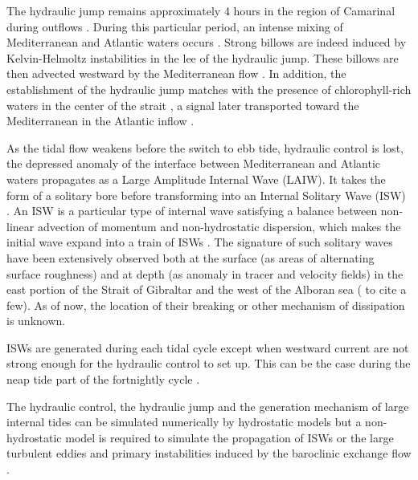 The hydraulic jump remains approximately 4 hours in the region of Camarinal during outflows \citep{FA1988,vlasenko_2009}. During this particular period, an intense mixing of Mediterranean and Atlantic waters occurs \citep{wesson_1994,macias_2006,GarciaLafuente2011}. Strong billows are indeed induced by Kelvin-Helmoltz instabilities in the lee of the hydraulic jump. These billows are then advected westward by the Mediterranean flow \citep{wesson_1994}. In addition, the establishment of the hydraulic jump matches with the presence of chlorophyll-rich waters in the center of the strait \color{red}, a signal later transported toward the Mediterranean in the Atlantic inflow\color{black} \citep{bruno_2013}.

\color{red}As the tidal flow weakens before the switch to ebb tide, hydraulic control is lost\color{black}, the depressed anomaly of the interface between Mediterranean and Atlantic waters propagates as a Large Amplitude Internal Wave (LAIW). It takes the form of a solitary bore before transforming into an Internal Solitary Wave (ISW) \citep{FA1988}. An ISW is a particular type of internal wave satisfying a balance between non-linear advection of momentum and non-hydrostatic dispersion, which makes the initial wave expand into a train of ISWs \citep{vlasenko_2000}. The signature of such solitary waves have been extensively observed both at the surface (as areas of alternating surface roughness) and at depth (as anomaly in tracer and velocity fields) in the east portion of the Strait of Gibraltar and the west of the Alboran sea (\citet{ziegenbein_1970,FA1988,watson_1990,sanchezgarrido_2008} to cite a few). \color{red}As of now, the location of their breaking or other mechanism of dissipation is unknown\color{black}.%

ISWs are generated during each tidal cycle except when westward current are not strong enough for the hydraulic control to set up. This can be the case during the neap tide part of the fortnightly cycle \citep{watson_1990}.

The hydraulic control, the hydraulic jump and the generation mechanism of large internal tides can be simulated numerically by hydrostatic models but a non-hydrostatic model is required to simulate the propagation of ISWs or the large turbulent eddies and primary instabilities induced by the baroclinic exchange flow \citep{brandt_1996,vlasenko_2009}.

